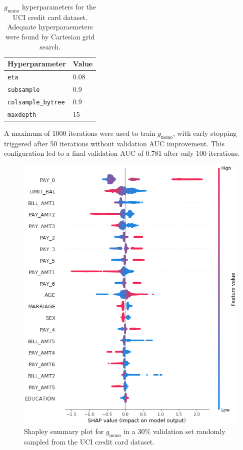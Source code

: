 \documentclass[11pt]{asaproc}
\begin{document}
\begin{table}[ht]
	\centering
	\caption{$g_{\text{mono}}$ hyperparameters for the UCI credit card dataset. Adequate hyperparaemeters were found by Cartesian grid search.}
	\begin{tabular}{ | p{3.5cm} | p{1.2cm} | }
	\hline
	Hyperparameter & Value \\ 
	\hline
	\texttt{eta} & 0.08 \\
	\hline	
	\texttt{subsample} & 0.9 \\
	\hline	
	\texttt{colsample\_bytree} & 0.9 \\
	\hline
	\texttt{maxdepth} & 15 \\	
	\hline
	\end{tabular}
	\label{tab:mono_gbm}
\end{table}	 

\noindent A maximum of 1000 iterations were used to train $g_{\text{mono}}$, with early stopping triggered after 50 iterations without validation AUC improvement. This configuration led to a final validation AUC of 0.781 after only 100 iterations. 

\begin{figure}[htb]
	\begin{center}
		\includegraphics[scale=0.4]{img/figure_7.eps}
		\caption{Shapley summary plot for $g_{\text{mono}}$ in a 30\% validation set randomly sampled from the UCI credit card dataset.}
		\label{fig:cc_global_shapley}
	\end{center}
\end{figure}
\end{document}
